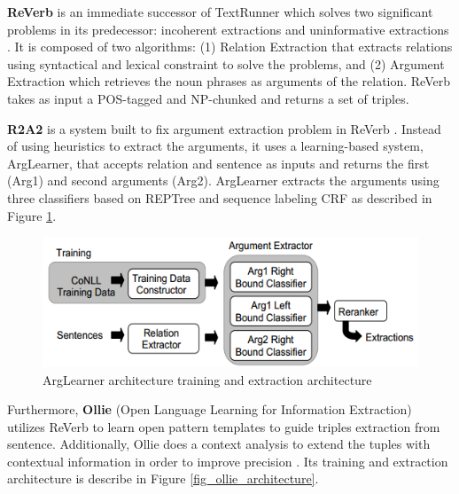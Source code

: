 \textbf{ReVerb} is an immediate successor of TextRunner which solves two significant problems in its predecessor: incoherent extractions and uninformative extractions  \citep{fader2011identifying}. It is composed of two algorithms: (1) Relation Extraction that extracts relations using syntactical and lexical constraint to solve the problems, and (2) Argument Extraction which retrieves the noun phrases as arguments of the relation. ReVerb takes as input a POS-tagged and NP-chunked and returns a set of triples.

\textbf{R2A2} is a system built to fix argument extraction problem in ReVerb  \citep{etzioni2011open}. Instead of using heuristics to extract the arguments, it uses a learning-based system, ArgLearner, that accepts relation and sentence as inputs and returns the first (Arg1) and second arguments (Arg2). ArgLearner extracts the arguments using three classifiers based on REPTree and sequence labeling CRF as described in Figure \ref{fig_arglearner_architecture}.

\begin{figure}
\centering
\includegraphics[scale=0.5]{../images/arglearner_architecture.png}
\caption{ArgLearner architecture training and extraction architecture}
\label{fig_arglearner_architecture}
\end{figure}

Furthermore, \textbf{Ollie} (Open Language Learning for Information Extraction) \citep{schmitz2012open} utilizes ReVerb \citep{fader2011identifying} to learn open pattern templates to guide triples extraction from sentence. Additionally, Ollie does a context analysis to extend the tuples with contextual information in order to improve precision \citep{schmitz2012open}. Its training and extraction architecture is describe in Figure \ref{fig_ollie_architecture}.


